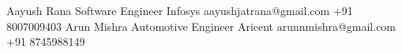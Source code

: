 %
%
%


\begin{referees}
		{Aayush Rana}
		{Software Engineer}
		{Infosys}
		{aayushjatrana@gmail.com}
		{+91 8007009403}
		{Arun Mishra}
		{Automotive Engineer}
		{Aricent}
		{arunnmishra@gmail.com}
		{+91 8745988149}
\end{referees}